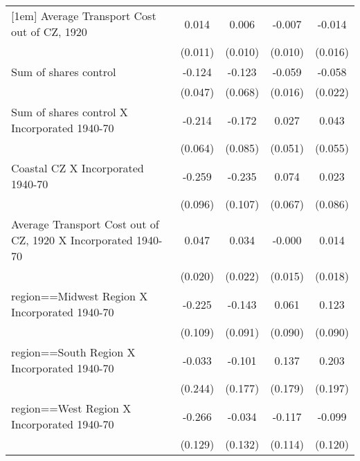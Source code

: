 \begin{table}[htbp]
\begin{tabular}{l*{4}{c}}
[1em]
Average Transport Cost out of CZ, 1920&       0.014         &       0.006         &      -0.007         &      -0.014         \\
                    &     (0.011)         &     (0.010)         &     (0.010)         &     (0.016)         \\
[1em]
Sum of shares control&      -0.124\sym{***}&      -0.123\sym{*}  &      -0.059\sym{***}&      -0.058\sym{**} \\
                    &     (0.047)         &     (0.068)         &     (0.016)         &     (0.022)         \\
[1em]
Sum of shares control X Incorporated 1940-70&      -0.214\sym{***}&      -0.172\sym{**} &       0.027         &       0.043         \\
                    &     (0.064)         &     (0.085)         &     (0.051)         &     (0.055)         \\
[1em]
Coastal CZ X Incorporated 1940-70&      -0.259\sym{***}&      -0.235\sym{**} &       0.074         &       0.023         \\
                    &     (0.096)         &     (0.107)         &     (0.067)         &     (0.086)         \\
[1em]
Average Transport Cost out of CZ, 1920 X Incorporated 1940-70&       0.047\sym{**} &       0.034         &      -0.000         &       0.014         \\
                    &     (0.020)         &     (0.022)         &     (0.015)         &     (0.018)         \\
[1em]
region==Midwest Region X Incorporated 1940-70&      -0.225\sym{**} &      -0.143         &       0.061         &       0.123         \\
                    &     (0.109)         &     (0.091)         &     (0.090)         &     (0.090)         \\
[1em]
region==South Region X Incorporated 1940-70&      -0.033         &      -0.101         &       0.137         &       0.203         \\
                    &     (0.244)         &     (0.177)         &     (0.179)         &     (0.197)         \\
[1em]
region==West Region X Incorporated 1940-70&      -0.266\sym{**} &      -0.034         &      -0.117         &      -0.099         \\
                    &     (0.129)         &     (0.132)         &     (0.114)         &     (0.120)         \\

\end{tabular}
\end{table}
